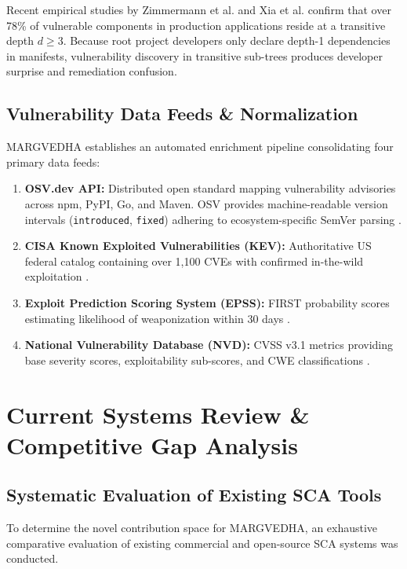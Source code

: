 \documentclass[12pt,a4paper,oneside]{report}
\begin{document}
Recent empirical studies by Zimmermann et al. \cite{zimmermann2019small} and Xia et al. \cite{xia2025vdgraph} confirm that over 78\% of vulnerable components in production applications reside at a transitive depth $d \ge 3$. Because root project developers only declare depth-1 dependencies in manifests, vulnerability discovery in transitive sub-trees produces developer surprise and remediation confusion.

\section{Vulnerability Data Feeds \& Normalization}
MARGVEDHA establishes an automated enrichment pipeline consolidating four primary data feeds:
\begin{enumerate}
    \item \textbf{OSV.dev API:} Distributed open standard mapping vulnerability advisories across npm, PyPI, Go, and Maven. OSV provides machine-readable version intervals (\texttt{introduced}, \texttt{fixed}) adhering to ecosystem-specific SemVer parsing \cite{google2021osv}.
    \item \textbf{CISA Known Exploited Vulnerabilities (KEV):} Authoritative US federal catalog containing over 1,100 CVEs with confirmed in-the-wild exploitation \cite{cisa2021bod2201}.
    \item \textbf{Exploit Prediction Scoring System (EPSS):} FIRST probability scores estimating likelihood of weaponization within 30 days \cite{jacobs2021epss}.
    \item \textbf{National Vulnerability Database (NVD):} CVSS v3.1 metrics providing base severity scores, exploitability sub-scores, and CWE classifications \cite{first2023cvss}.
\end{enumerate}

\chapter{Current Systems Review \& Competitive Gap Analysis}

\section{Systematic Evaluation of Existing SCA Tools}
To determine the novel contribution space for MARGVEDHA, an exhaustive comparative evaluation of existing commercial and open-source SCA systems was conducted. 
\end{document}
